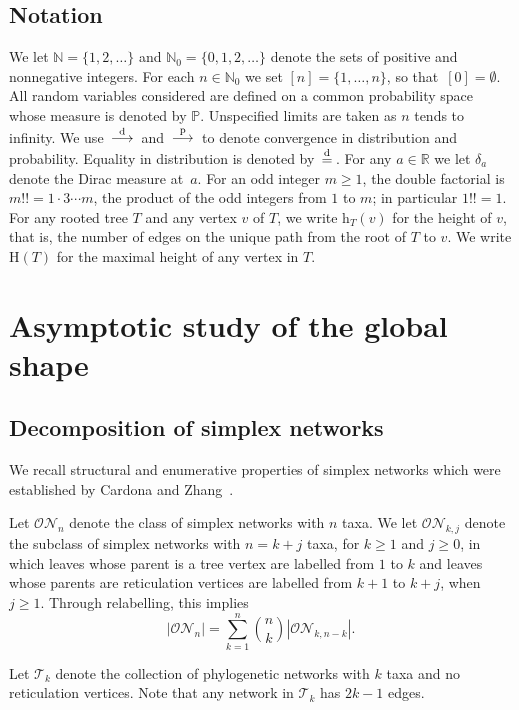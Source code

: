 \documentclass[english,11pt]{smfart}
\newcommand{\ndN}{\mathbb{N}}
\newcommand{\ndR}{\mathbb{R}}
\newcommand{\convdis}{\,{\buildrel \mathrm{d} \over \longrightarrow}\,}
\newcommand{\convp}{\,{\buildrel \mathrm{p} \over \longrightarrow}\,}
\newcommand{\eqdist}{\,{\buildrel \mathrm{d} \over =}\,}
\newcommand{\He}{\mathrm{H}}
\newcommand{\he}{\mathrm{h}}
\newcommand{\cN}{\mathcal{N}}
\newcommand{\cO}{\mathcal{O}}
\newcommand{\cT}{\mathcal{T}}
\numberwithin{equation}{section}
\begin{document}
\subsection*{Notation}

We  let $\ndN = \{1, 2, \ldots\}$ and $\ndN_0 = \{0, 1, 2, \ldots\}$ denote the sets of positive and nonnegative integers. For each $n \in \ndN_0$ we set $[n] = \{1, \ldots, n\}$, so that~$[0]=\emptyset$. All random variables considered are defined on a common probability space whose measure is denoted by $\mathbb{P}$. Unspecified limits are taken as $n$ tends to infinity. We use $\convdis$ and $\convp$ to denote convergence in distribution and probability. Equality in distribution is denoted by $\eqdist$. For any $a \in \ndR$ we let $\delta_a$ denote the Dirac measure at~$a$.
For an odd integer $m\ge 1$, the double factorial is $m!!=1\cdot 3\cdots m$, the
product of the odd integers from $1$ to $m$; in particular $1!!=1$. For any rooted tree $T$ and any vertex $v$ of $T$, we write $\he_T(v)$ for the height of $v$, that is, the number of edges on the unique path from the root of $T$ to $v$. We write $\He(T)$ for the maximal height of any vertex in $T$.

\section{Asymptotic study of the global shape}
\label{sec:global}

\subsection{Decomposition of simplex networks}
\label{sec:deco}

We recall structural and enumerative properties of simplex networks which were established by Cardona and Zhang~\cite{zbMATH07244280}.

Let $\cO\cN_n$ denote the class of simplex networks with $n$ taxa. We let $\cO\cN_{k,j}$ denote the subclass of simplex networks with $n=k+j$ taxa, for $k \geq 1$ and $j \geq 0$, in which leaves whose parent is a tree vertex are labelled from $1$ to $k$ and leaves whose parents are reticulation vertices are labelled from $k+1$ to $k+j$, when $j \geq 1$. Through relabelling, this implies
\[
	|\cO \cN_n| = \sum_{k=1}^n \binom{n}{k} |\cO \cN_{k,n-k}|.
\]

Let $\cT_k$ denote the collection of phylogenetic networks with $k$ taxa and no reticulation vertices. Note that any network in $\cT_k$ has $2k-1$ edges. 
\smallskip
\end{document}

